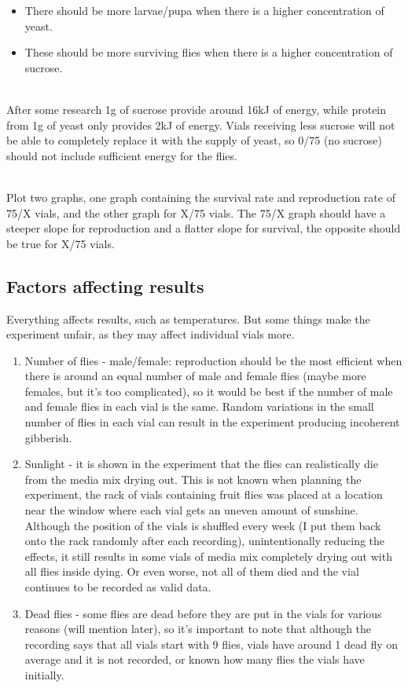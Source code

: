 \documentclass{article}
\begin{document}
\begin{itemize}
  \item There should be more larvae/pupa when there is a higher concentration of yeast.
  \item These should be more surviving flies when there is a higher concentration of sucrose.
\end{itemize}

\noindent\\
After some research 1g of sucrose provide around 16kJ of energy, while protein from 1g of yeast only provides 2kJ of energy. Vials receiving less sucrose will not be able to completely replace it with the supply of yeast, so 0/75 (no sucrose) should not include sufficient energy for the flies.

\noindent\\
Plot two graphs, one graph containing the survival rate and reproduction rate of 75/X vials, and the other graph for X/75 vials. The 75/X graph should have a steeper slope for reproduction and a flatter slope for survival, the opposite should be true for X/75 vials.

\subsection{Factors affecting results}

Everything affects results, such as temperatures. But some things make the experiment unfair, as they may affect individual vials more.

\begin{enumerate}
  \item Number of flies - male/female: reproduction should be the most efficient when there is around an equal number of male and female flies (maybe more females, but it's too complicated), so it would be best if the number of male and female flies in each vial is the same. Random variations in the small number of flies in each vial can result in the experiment producing incoherent gibberish.
  \item Sunlight - it is shown in the experiment that the flies can realistically die from the media mix drying out. This is not known when planning the experiment, the rack of vials containing fruit flies was placed at a location near the window where each vial gets an uneven amount of sunshine. Although the position of the vials is shuffled every week (I put them back onto the rack randomly after each recording), unintentionally reducing the effects, it still results in some vials of media mix completely drying out with all flies inside dying. Or even worse, not all of them died and the vial continues to be recorded as valid data.
  \item Dead flies - some flies are dead before they are put in the vials for various reasons (will mention later), so it's important to note that although the recording says that all vials start with 9 flies, vials have around 1 dead fly on average and it is not recorded, or known how many flies the vials have initially.
\end{enumerate}
\end{document}
